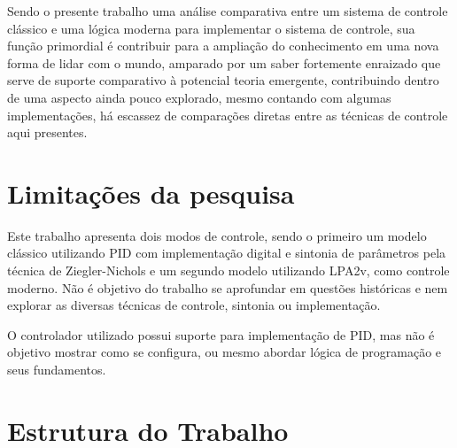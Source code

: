 Sendo o presente trabalho uma análise comparativa entre um sistema de controle clássico e uma lógica moderna para implementar o sistema de controle, sua função primordial é contribuir para a ampliação do conhecimento em uma nova forma de lidar com o mundo, amparado por um saber fortemente enraizado que serve de suporte comparativo à potencial teoria emergente, contribuindo dentro de uma aspecto ainda pouco explorado, mesmo contando com algumas implementações, há escassez de comparações diretas entre as técnicas de controle aqui presentes.



\section{Limitações da pesquisa}


Este trabalho apresenta dois modos de controle, sendo o primeiro um modelo clássico utilizando PID com implementação digital e sintonia de parâmetros pela técnica de Ziegler-Nichols e um segundo modelo utilizando LPA2v, como controle moderno. Não é objetivo do trabalho se aprofundar em questões históricas e nem explorar as diversas técnicas de controle, sintonia ou implementação.

O controlador utilizado possui suporte para implementação de PID, mas não é objetivo mostrar como se configura, ou mesmo abordar lógica de programação e seus fundamentos.



\section{Estrutura do Trabalho}


